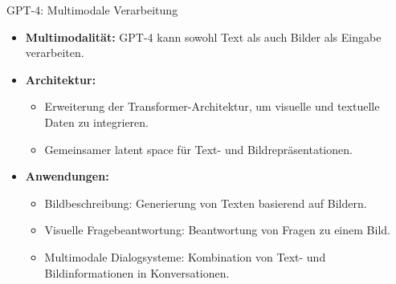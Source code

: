 \documentclass[aspectratio=1610, xcolor=dvipsnames, 9pt]{beamer}
\begin{document}
\begin{frame}{GPT-4: Multimodale Verarbeitung}
  \begin{itemize}
    \item \textbf{Multimodalität:} GPT-4 kann sowohl Text als auch Bilder als Eingabe verarbeiten.
    \item \textbf{Architektur:}
      \begin{itemize}
        \item Erweiterung der Transformer-Architektur, um visuelle und textuelle Daten zu integrieren.
        \item Gemeinsamer latent space für Text- und Bildrepräsentationen.
      \end{itemize}
    \item \textbf{Anwendungen:}
      \begin{itemize}
        \item Bildbeschreibung: Generierung von Texten basierend auf Bildern.
        \item Visuelle Fragebeantwortung: Beantwortung von Fragen zu einem Bild.
        \item Multimodale Dialogsysteme: Kombination von Text- und Bildinformationen in Konversationen.
      \end{itemize}
  \end{itemize}
\end{frame}
\end{document}
